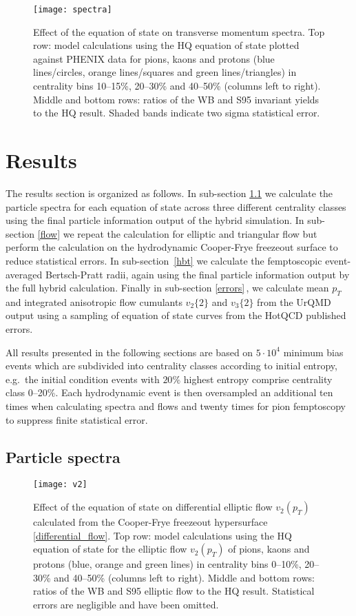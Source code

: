 \documentclass[aps,prc,reprint,amsmath,nofootinbib,superscriptaddress]{revtex4-1}
\begin{document}
\begin{figure*}[t]
  \texttt{[image: spectra]}
  \caption{
    \label{fig:spectra} Effect of the equation of state on transverse momentum spectra. Top row: model calculations using the HQ equation of state plotted against 
    PHENIX data \cite{Adler:2003cb} for pions, kaons and protons (blue lines/circles, orange lines/squares and green lines/triangles) in centrality bins 10--15\%, 20--30\% and 40--50\% 
    (columns left to right). Middle and bottom rows: ratios of the WB and S95 invariant yields to the HQ result. Shaded bands indicate two sigma statistical error. }
\end{figure*}

\section{Results}
\label{results}

The results section is organized as follows. In sub-section \ref{spectra} we calculate the particle spectra for each equation of state across three different centrality classes using the final 
particle information output of the hybrid simulation. In sub-section \ref{flow} we repeat the calculation for elliptic and triangular flow but perform the calculation on the 
hydrodynamic Cooper-Frye freezeout surface to reduce statistical errors. In sub-section~\ref{hbt} we calculate the femptoscopic event-averaged Bertsch-Pratt radii, again using the 
final particle information output by the full hybrid calculation. Finally in sub-section \ref{errors}\,, we calculate mean $p_T$ and integrated anisotropic flow cumulants $v_2\{2\}$ and $v_3\{2\}$ from the UrQMD output using a sampling of equation of state curves from the HotQCD published errors. 

All results presented in the following sections are based on $5\cdot10^4$ minimum bias events which are subdivided into centrality classes according to initial entropy, e.g.\ the initial condition events with $20\%$ highest entropy comprise centrality class 0--20\%. Each hydrodynamic event is then oversampled an additional ten times when calculating spectra and flows and
twenty times for pion femptoscopy to suppress finite statistical error.

\subsection{Particle spectra}
\label{spectra}

\begin{figure*}[t]
  \texttt{[image: v2]}
  \caption{
    \label{fig:v2} Effect of the equation of state on differential elliptic flow $v_2(p_T)$ calculated from the Cooper-Frye freezeout hypersurface \eqref{differential_flow}.
    Top row: model calculations using the HQ equation of state for the elliptic flow $v_2(p_T)$ of pions, kaons and protons (blue, orange and green lines) 
    in centrality bins 0--10\%, 20--30\% and 40--50\% (columns left to right). Middle and bottom rows: ratios of the WB and S95 elliptic flow to 
    the HQ result. Statistical errors are negligible and have been omitted.
  }
\end{figure*}
\end{document}
